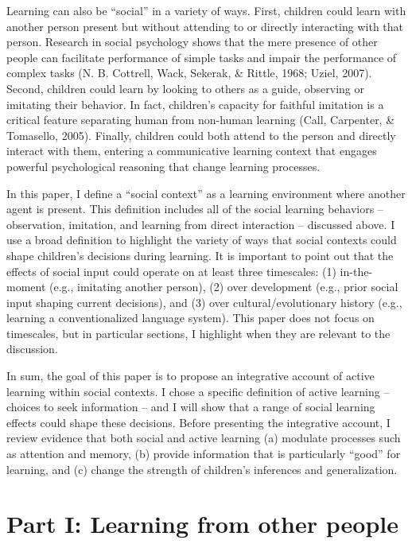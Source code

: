 \documentclass[english,floatsintext,man]{apa6}
\theoremstyle{definition}
\theoremstyle{definition}
\theoremstyle{definition}
\theoremstyle{remark}
\begin{document}
Learning can also be \enquote{social} in a variety of ways. First,
children could learn with another person present but without attending
to or directly interacting with that person. Research in social
psychology shows that the mere presence of other people can facilitate
performance of simple tasks and impair the performance of complex tasks
(N. B. Cottrell, Wack, Sekerak, \& Rittle, 1968; Uziel, 2007). Second,
children could learn by looking to others as a guide, observing or
imitating their behavior. In fact, children's capacity for faithful
imitation is a critical feature separating human from non-human learning
(Call, Carpenter, \& Tomasello, 2005). Finally, children could both
attend to the person and directly interact with them, entering a
communicative learning context that engages powerful psychological
reasoning that change learning processes.

In this paper, I define a \enquote{social context} as a learning
environment where another agent is present. This definition includes all
of the social learning behaviors -- observation, imitation, and learning
from direct interaction -- discussed above. I use a broad definition to
highlight the variety of ways that social contexts could shape
children's decisions during learning. It is important to point out that
the effects of social input could operate on at least three timescales:
(1) in-the-moment (e.g., imitating another person), (2) over development
(e.g., prior social input shaping current decisions), and (3) over
cultural/evolutionary history (e.g., learning a conventionalized
language system). This paper does not focus on timescales, but in
particular sections, I highlight when they are relevant to the
discussion.

In sum, the goal of this paper is to propose an integrative account of
active learning within social contexts. I chose a specific definition of
active learning -- choices to seek information -- and I will show that a
range of social learning effects could shape these decisions. Before
presenting the integrative account, I review evidence that both social
and active learning (a) modulate processes such as attention and memory,
(b) provide information that is particularly \enquote{good} for
learning, and (c) change the strength of children's inferences and
generalization.

\hypertarget{p1}{\section{Part I: Learning from other people}\label{p1}}
\end{document}
